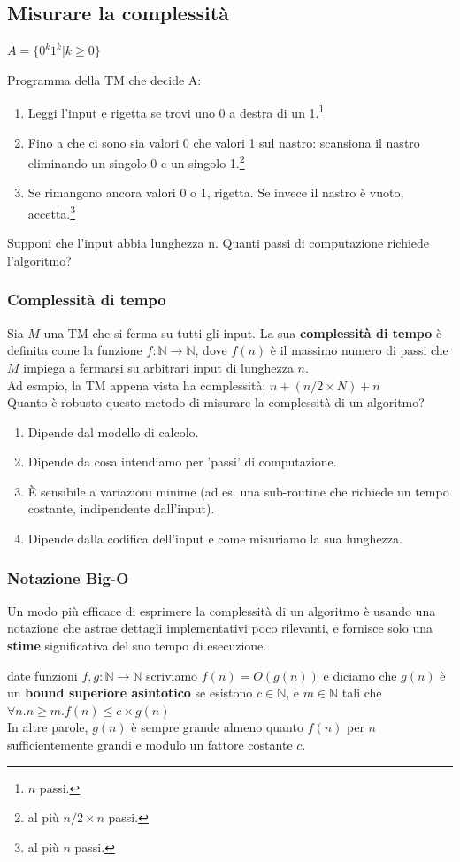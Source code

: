 \documentclass[a4paper, 12pt]{article}
\begin{document}
\subsection{Misurare la complessit\`a}
\begin{center}
$A = \{0^{k}1^{k} | k \geq 0\}$
\end{center}
Programma della TM che decide A:
\begin{enumerate}
\item Leggi l'input e rigetta se trovi uno 0 a destra di un 1.\footnote{$n$ passi.}
\item Fino a che ci sono sia valori 0 che valori 1 sul nastro: scansiona il nastro eliminando un singolo 0 e un singolo 1.\footnote{al pi\`u $n/2 \times n$ passi.}
\item Se rimangono ancora valori 0 o 1, rigetta. Se invece il nastro \`e vuoto, accetta.\footnote{al pi\`u $n$ passi.}
\end{enumerate}
Supponi che l'input abbia lunghezza n. Quanti passi di computazione richiede l'algoritmo?
\subsubsection{Complessit\`a di tempo}
Sia $M$ una TM che si ferma su tutti gli input. La sua \textbf{complessit\`a di tempo} \`e definita come la funzione $f: \mathbb{N} \rightarrow \mathbb{N}$, dove $f(n)$ \`e il massimo numero di passi che $M$ impiega a fermarsi su arbitrari input di lunghezza $n$.\\
Ad esmpio, la TM appena vista ha complessit\`a: $n + (n/2 \times N) + n$\\
Quanto \`e robusto questo metodo di misurare la complessit\`a di un algoritmo?
\begin{enumerate}
\item Dipende dal modello di calcolo.
\item Dipende da cosa intendiamo per 'passi' di computazione.
\item \`E sensibile a variazioni minime (ad es. una sub-routine che richiede un tempo costante, indipendente dall'input).
\item Dipende dalla codifica dell'input e come misuriamo la sua lunghezza.
\end{enumerate}

\subsubsection{Notazione Big-O}
Un modo pi\`u efficace di esprimere la complessit\`a  di un algoritmo \`e usando una notazione che astrae dettagli implementativi poco rilevanti, e fornisce solo una \textbf{stime} significativa del suo tempo di esecuzione.
\begin{center}
date funzioni $f,g: \mathbb{N} \rightarrow \mathbb{N}$ scriviamo $f(n) = O(g(n))$ e diciamo che $g(n)$ \`e un \textbf{bound superiore asintotico} se esistono $c \in \mathbb{N}$, e $m \in \mathbb{N}$ tali che $\forall n. n \geq m. f(n) \leq c \times g(n)$\\In altre parole, $g(n)$ \`e sempre grande almeno quanto $f(n)$ per $n$ sufficientemente grandi e modulo un fattore costante $c$.
\end{center}
\end{document}
